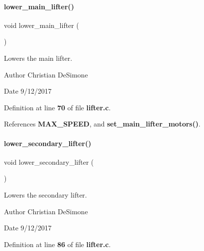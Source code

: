 \mbox{\label{lifter_8c_ad36c37086a91046af4e6f619618b7719}} 
\paragraph{lower\+\_\+main\+\_\+lifter()}
{\footnotesize\ttfamily void lower\+\_\+main\+\_\+lifter (\begin{DoxyParamCaption}{ }\end{DoxyParamCaption})}



Lowers the main lifter. 

\begin{DoxyAuthor}{Author}
Christian De\+Simone 
\end{DoxyAuthor}
\begin{DoxyDate}{Date}
9/12/2017 
\end{DoxyDate}


Definition at line \textbf{ 70} of file \textbf{ lifter.\+c}.



References \textbf{ M\+A\+X\+\_\+\+S\+P\+E\+ED}, and \textbf{ set\+\_\+main\+\_\+lifter\+\_\+motors()}.

\mbox{\label{lifter_8c_af76abbd394bf206ab56fa237d776f2b3}} 
\paragraph{lower\+\_\+secondary\+\_\+lifter()}
{\footnotesize\ttfamily void lower\+\_\+secondary\+\_\+lifter (\begin{DoxyParamCaption}{ }\end{DoxyParamCaption})}



Lowers the secondary lifter. 

\begin{DoxyAuthor}{Author}
Christian De\+Simone 
\end{DoxyAuthor}
\begin{DoxyDate}{Date}
9/12/2017 
\end{DoxyDate}


Definition at line \textbf{ 86} of file \textbf{ lifter.\+c}.



